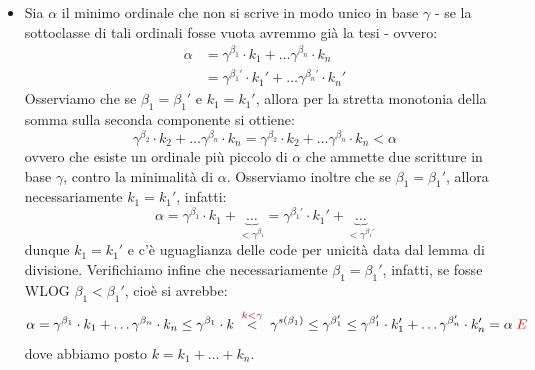 \begin{soln}
\begin{itemize}
		\[ \gamma^\beta \leq \gamma^{\beta_2} \leq \gamma^{\beta_2} \cdot k_2 + \ldots + \gamma^{\beta_n} \cdot k_n = \rho \;\textcolor{red}<\; \gamma^{\beta} \quad \textcolor{red}\lightning
			\]
		quindi abbiamo ottenuto che esiste almeno una scrittura in base $\gamma$ per $\alpha$. Ci resta soltanto da verificare l'assunzione iniziale che $\delta$ sia successore e non limite, se $\delta$ fosse limite si avrebbe:
		\[ \alpha < \gamma^\delta = \sup_{\varepsilon < \delta} \gamma^{\varepsilon}
			\]
		affinch\'e la disuguaglianza sia vera l'insieme di ordinali su cui si prende il sup al RHS deve essere non vuoto, cio\`e deve esistere $\varepsilon < \delta$ tale che $\alpha < \gamma^{\varepsilon}$, contro la minimalit\`a di $\delta$. Alternativamente
		si pu\`o osservare che, per la minimalit\`a di $\delta$, si ha $\forall \varepsilon < \delta \; \gamma^{\varepsilon} \leq \alpha$, e, passando questa disuguaglianza al sup - cosa che si pu\`o fare per il lemma sulla disuguaglianza dei sup - si ottiene $\gamma^\delta = \sup_{\varepsilon < \delta} \gamma^{\varepsilon} \leq \alpha \; \textcolor{red}\lightning$.
		\item[$\boxed{\text{unicit\`a}}$] Sia $\alpha$ il minimo ordinale che non si scrive in modo unico in base $\gamma$ - se la sottoclasse di tali ordinali fosse vuota avremmo gi\`a la tesi - ovvero:
		\begin{align*}
			\alpha &= \gamma^{\beta_1}\cdot k_1 + \ldots \gamma^{\beta_n}\cdot k_n \\
				   &= \gamma^{\beta_1'}\cdot k_1' + \ldots \gamma^{\beta_n'}\cdot k_n'
		\end{align*}
		Osserviamo che se $\beta_1 = \beta_1'$ e $k_1 = k_1'$, allora per la stretta monotonia della somma sulla seconda componente si ottiene:
		\[ \gamma^{\beta_2}\cdot k_2 + \ldots \gamma^{\beta_n}\cdot k_n = \gamma^{\beta_2}\cdot k_2 + \ldots \gamma^{\beta_n}\cdot k_n < \alpha
			\]
		ovvero che esiste un ordinale pi\`u piccolo di $\alpha$ che ammette due scritture in base $\gamma$, contro la minimalit\`a di $\alpha$. Osserviamo inoltre che se $\beta_1 = \beta_1'$,
		allora necessariamente $k_1 = k_1'$, infatti:
		\[ \alpha = \gamma^{\beta_1}\cdot k_1 + \underbrace{\ldots}_{<\gamma^{\beta_1}} = \gamma^{\beta_1'} \cdot k_1' + \underbrace{\ldots}_{<\gamma^{\beta_1'}} 
			\]
		dunque $k_1 = k_1'$ e c'\`e uguaglianza delle code per unicit\`a data dal lemma di divisione.
		Verifichiamo infine che necessariamente $\beta_1 = \beta_1 '$, infatti, se fosse WLOG $\beta_1 < \beta_1'$, cio\`e si avrebbe:
		\[ \alpha = \gamma^{\beta_1}\cdot k_1 + \ldots \gamma^{\beta_n}\cdot k_n \leq \gamma^{\beta_1} \cdot k \;\overset{\textcolor{purple}{k < \gamma}}{<}\; \gamma^{s(\beta_1)} \leq \gamma^{\beta_1 '} \leq \gamma^{\beta_1'}\cdot k_1' + \ldots \gamma^{\beta_n'}\cdot k_n' = \alpha \; \textcolor{red}\lightning
			\]
		dove abbiamo posto $k = k_1 + \ldots + k_n$.
	\end{itemize}
\end{soln}

